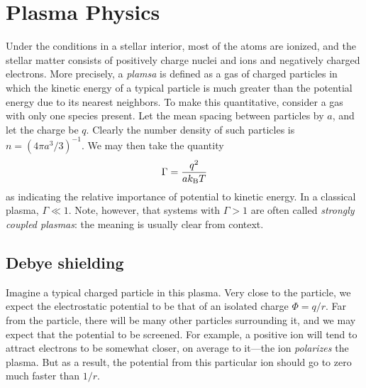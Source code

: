 \chapter{Plasma Physics}

Under the conditions in a stellar interior, most of the atoms are ionized, and the stellar matter consists of positively charge nuclei and ions and negatively charged electrons. More precisely,
a \emph{plamsa} is defined as a gas of charged particles in which the kinetic energy of a typical particle is much greater than the potential energy due to its nearest neighbors. To make this quantitative, consider a gas with only one species present.  Let the mean spacing between particles by $a$, and let the charge be $q$.  Clearly the number density of such particles is $n = (4\pi a^{3}/3)^{-1}$.  We may then take the quantity
\begin{equation}\label{e.Gamma-definition}
\Gamma = \frac{q^{2}}{ak_\mathrm{B} T}
\end{equation}
as indicating the relative importance of potential to kinetic energy.  In a classical plasma, $\Gamma \ll 1$.  Note, however, that systems with $\Gamma > 1$ are often called \emph{strongly coupled plasmas}: the meaning is usually clear from context.

\section{Debye shielding}\label{s.plasma-shielding}

Imagine a typical charged particle in this plasma.  Very close to the particle, we expect the electrostatic potential to be that of an isolated charge $\Phi = q/r$. Far from the particle, there will be many other particles surrounding it, and we may expect that the potential to be screened. For example, a positive ion will tend to attract electrons to be somewhat closer, on average to it---the ion \emph{polarizes} the plasma.  But as a result, the potential from this particular ion should go to zero much faster than $1/r$.

